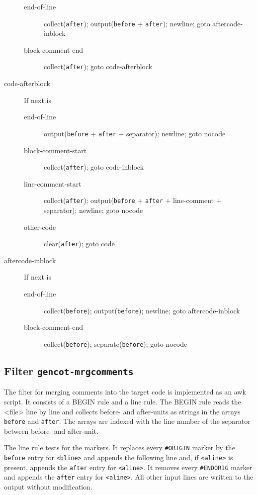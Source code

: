\documentclass[a4paper]{report}
\newcommand{\code}[1]{\textnormal{\texttt{#1}}}
\begin{document}
\begin{description}
\begin{description}
  \item[end-of-line] collect(\code{after}); output(\code{before} + \code{after}); newline; goto aftercode-inblock
  \item[block-comment-end] collect(\code{after}); goto code-afterblock
  \end{description}
\item[code-afterblock] If next is
  \begin{description}
  \item[end-of-line] output(\code{before} + \code{after} + separator); newline; goto nocode
  \item[block-comment-start] collect(\code{after}); goto code-inblock
  \item[line-comment-start] collect(\code{after}); output(\code{before} + \code{after} + line-comment + separator); newline; goto nocode
  \item[other-code] clear(\code{after}); goto code
  \end{description}
\item[aftercode-inblock] If next is
  \begin{description}
  \item[end-of-line] collect(\code{before}); output(\code{before}); newline; goto aftercode-inblock
  \item[block-comment-end] collect(\code{before}); separate(\code{before}); goto nocode
  \end{description}
\end{description}

\subsection{Filter \code{gencot-mrgcomments}}

The filter for merging comments into the target code is implemented as an awk script. It consists of a BEGIN rule and a line rule.
The BEGIN rule reads the <file> line by line and collects before- and after-units as strings in the arrays \code{before} and \code{after}.
The arrays are indexed with the line number of the separator between before- and after-unit.

The line rule tests for the markers. It replaces every \code{\#ORIGIN} marker by the \code{before} entry for \code{<bline>} and appends the 
following line and, if \code{<aline>} is present, appends the \code{after} entry for \code{<aline>}. It removes every \code{\#ENDORIG}
marker and appends the \code{after} entry for \code{<aline>}. All other input lines are written to the output without 
modification.
\end{document}
